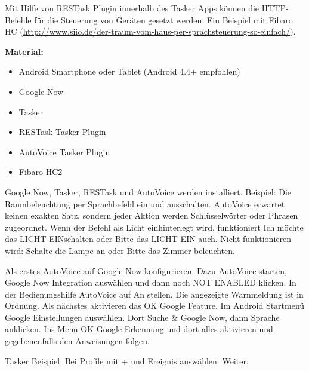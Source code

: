 Mit Hilfe von RESTask Plugin innerhalb des Tasker Apps können die HTTP-Befehle für die
Steuerung von Geräten gesetzt werden. Ein Beispiel mit Fibaro HC (\url{http://www.siio.de/der-traum-vom-haus-per-sprachsteuerung-so-einfach/}).

\textbf{Material:}

\begin{itemize}
\item Android Smartphone oder Tablet (Android 4.4+ empfohlen)
\item Google Now
\item Tasker
\item RESTask Tasker Plugin
\item AutoVoice Tasker Plugin
\item Fibaro HC2
\end{itemize}

Google Now, Tasker, RESTask und AutoVoice werden installiert.
Beispiel: Die Raumbeleuchtung per Sprachbefehl ein und ausschalten. AutoVoice erwartet keinen exakten Satz, sondern jeder Aktion werden Schlüsselwörter oder Phrasen zugeordnet. Wenn der Befehl als \glqq Licht ein\grqq hinterlegt wird, funktioniert \glqq Ich möchte das LICHT EINschalten\grqq{} oder \glqq Bitte das LICHT EIN\grqq{} auch. Nicht funktionieren wird: \glqq Schalte die Lampe an\grqq{} oder \glqq Bitte das Zimmer beleuchten\grqq.

Als erstes AutoVoice auf Google Now konfigurieren. Dazu AutoVoice starten, \glqq Google Now
Integration\grqq{} auswählen und dann noch \glqq NOT ENABLED\grqq{} klicken. In der Bedienungshilfe AutoVoice auf \glqq An\grqq{} stellen. Die angezeigte Warnmeldung ist in Ordnung. Als nächstes aktivieren das \glqq OK Google\grqq{} Feature. Im Android Startmenü \glqq Google Einstellungen\grqq{} auswählen. Dort \glqq Suche \& Google
Now\grqq , dann \glqq Sprache\grqq{} anklicken. Ins Menü \glqq OK Google Erkennung\grqq{} und dort alles aktivieren und gegebenenfalls den Anweisungen folgen.

Tasker Beispiel: Bei \glqq Profile\grqq{} mit \glqq +\grqq{} und \glqq Ereignis\grqq{} auswählen. Weiter:

